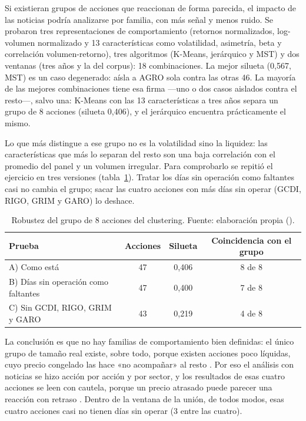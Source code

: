 Si existieran grupos de acciones que reaccionan de forma parecida, el impacto de las noticias
podría analizarse por familia, con más señal y menos ruido. Se probaron tres representaciones
de comportamiento (retornos normalizados, log-volumen normalizado y 13 características como
volatilidad, asimetría, beta y correlación volumen-retorno), tres algoritmos (K-Means,
jerárquico y MST) y dos ventanas (tres años y la del corpus): 18 combinaciones. La mejor
silueta (0,567, MST) es un caso degenerado: aísla a AGRO sola contra las otras 46. La mayoría
de las mejores combinaciones tiene esa firma —uno o dos casos aislados contra el resto—, salvo
una: K-Means con las 13 características a tres años separa un grupo de 8 acciones (silueta
0,406), y el jerárquico encuentra prácticamente el mismo.

Lo que más distingue a ese grupo no es la volatilidad sino la liquidez: las características
que más lo separan del resto son una baja correlación con el promedio del panel y un volumen
irregular. Para comprobarlo se repitió el ejercicio en tres versiones
(tabla~\ref{tab:liquidez}). Tratar los días sin operación como faltantes casi no cambia el
grupo; sacar las cuatro acciones con más días sin operar (GCDI, RIGO, GRIM y GARO) lo deshace.

\begin{table}[H]
\centering\small
\begin{tabular}{@{}lccc@{}}
\toprule
\textbf{Prueba} & \textbf{Acciones} & \textbf{Silueta} & \textbf{Coincidencia con el grupo} \\
\midrule
A) Como está & 47 & 0,406 & 8 de 8 \\
B) Días sin operación como faltantes & 47 & 0,400 & 7 de 8 \\
C) Sin GCDI, RIGO, GRIM y GARO & 43 & 0,219 & 4 de 8 \\
\bottomrule
\end{tabular}
\caption{Robustez del grupo de 8 acciones del clustering. Fuente: elaboración propia
().}
\label{tab:liquidez}
\end{table}

La conclusión es que no hay familias de comportamiento bien definidas: el único grupo de
tamaño real existe, sobre todo, porque existen acciones poco líquidas, cuyo precio congelado
las hace «no acompañar» al resto \citep{nanyonga2025,huth2011}. Por eso el análisis con
noticias se hizo acción por acción y por sector, y los resultados de esas cuatro acciones se
leen con cautela, porque un precio atrasado puede parecer una reacción con retraso
\citep{lomackinlay1990}. Dentro de la ventana de la unión, de todos modos, esas cuatro
acciones casi no tienen días sin operar (3 entre las cuatro).

